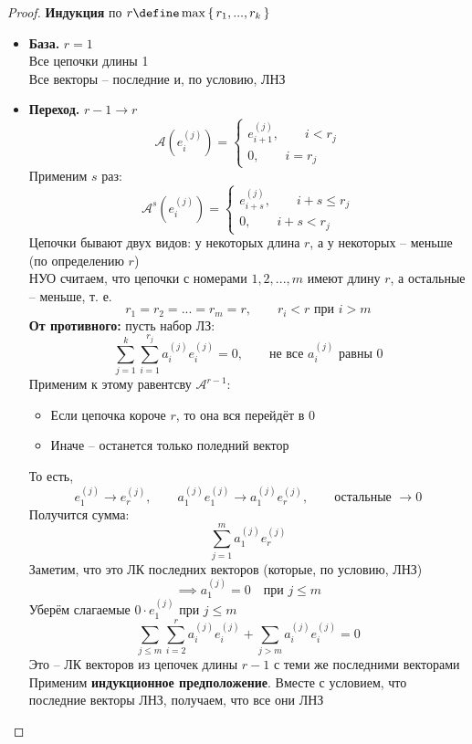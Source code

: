 \begin{proof}
	\textbf{Индукция} по $ r \define \max\set{r_1, ..., r_k} $
	\begin{itemize}
		\item \textbf{База.} $ r = 1 $ \\
		Все цепочки длины 1 \\
		Все векторы -- последние и, по условию, ЛНЗ
		\item \textbf{Переход.} $ r - 1 \to r $
		$$ \mathcal{A}(e_i^{(j)}) =
		\begin{cases}
			e_{i + 1}^{(j)}, \qquad i < r_j \\
			0, \qquad i = r_j
		\end{cases} $$
		Применим $ s $ раз:
		$$ \mathcal{A}^s(e_i^{(j)}) =
		\begin{cases}
			e_{i + s}^{(j)}, \qquad i + s \le r_j \\
			0, \qquad i + s < r_j
		\end{cases} $$
		Цепочки бывают двух видов: у некоторых длина $ r $, а у некоторых -- меньше (по определению $ r $) \\
		НУО считаем, что цепочки с номерами $ 1, 2, ..., m $ имеют длину $ r $, а остальные -- меньше, т. е.
		$$ r_1 = r_2 = ... = r_m = r, \qquad r_i < r \text{ при } i > m $$
		\textbf{От противного:} пусть набор ЛЗ:
		$$ \sum_{j = 1}^k \sum_{i = 1}^{r_j} a_i^{(j)}e_i^{(j)} = 0, \qquad \text{не все } a_i^{(j)} \text{ равны } 0 $$
		Применим к этому равентсву $ \mathcal{A}^{r- 1} $:
		\begin{itemize}
			\item Если цепочка короче $ r $, то она вся перейдёт в 0
			\item Иначе -- останется только поледний вектор
		\end{itemize}
		То есть,
		$$ e_1^{(j)} \to e_r^{(j)}, \qquad a_1^{(j)}e_1^{(j)} \to a_1^{(j)}e_r^{(j)}, \qquad \text{остальные } \to 0 $$
		Получится сумма:
		$$ \sum_{j = 1}^m a_1^{(j)} e_r^{(j)} $$
		Заметим, что это ЛК последних векторов (которые, по условию, ЛНЗ)
		$$ \implies a_1^{(j)} = 0 \quad \text{при } j \le m $$
		Уберём слагаемые $ 0 \cdot e_1^{(j)} $ при $ j \le m $
		$$ \sum_{j \le m} \sum_{i = 2}^r a_i^{(j)} e_i^{(j)} + \sum_{j > m}a_i^{(j)}e_i^{(j)} = 0 $$
		Это -- ЛК векторов из цепочек длины $ r - 1 $ с теми же последними векторами \\
		Применим \textbf{индукционное предположение}. Вместе с условием, что последние векторы ЛНЗ, получаем, что все они ЛНЗ
	\end{itemize}
\end{proof}

